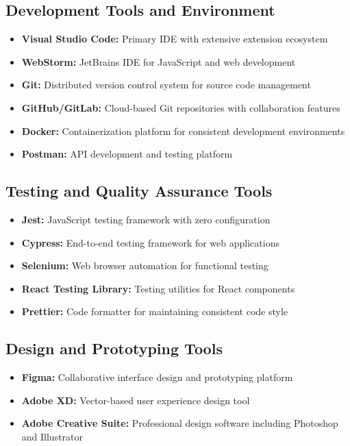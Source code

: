 \documentclass[12pt,a4paper]{report}
\newcommand{\tool}[1]{\textcolor{toolcolor}{\textbf{#1}}}
\newenvironment{coloritemize}
{\begin{itemize}[label=\textcolor{primaryblue}{$\bullet$}]}
{\end{itemize}}
\begin{document}
\subsection{Development Tools and Environment}
\begin{coloritemize}
    \item \tool{Visual Studio Code:} Primary IDE with extensive extension ecosystem
    \item \tool{WebStorm:} JetBrains IDE for JavaScript and web development
    \item \tool{Git:} Distributed version control system for source code management
    \item \tool{GitHub/GitLab:} Cloud-based Git repositories with collaboration features
    \item \tool{Docker:} Containerization platform for consistent development environments
    \item \tool{Postman:} API development and testing platform
\end{coloritemize}

\subsection{Testing and Quality Assurance Tools}
\begin{coloritemize}
    \item \tool{Jest:} JavaScript testing framework with zero configuration
    \item \tool{Cypress:} End-to-end testing framework for web applications
    \item \tool{Selenium:} Web browser automation for functional testing
    \item \tool{React Testing Library:} Testing utilities for React components
    \item \tool{Prettier:} Code formatter for maintaining consistent code style
\end{coloritemize}

\subsection{Design and Prototyping Tools}
\begin{coloritemize}
    \item \tool{Figma:} Collaborative interface design and prototyping platform
    \item \tool{Adobe XD:} Vector-based user experience design tool
    \item \tool{Adobe Creative Suite:} Professional design software including Photoshop and Illustrator
\end{coloritemize}
\end{document}
